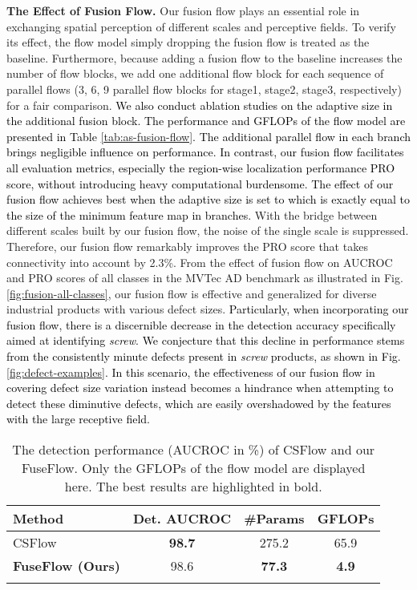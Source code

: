 \documentclass[lettersize,journal]{IEEEtran}
\newcommand{\myrule}{\specialrule{.1em}{.0ex}{.0ex}}
\newcommand{\rounda}[1]{\textcolor{black}{#1}}
\newcommand{\roundb}[1]{\textcolor{black}{#1}}
\begin{document}
\vspace{3pt}\textbf{The Effect of Fusion Flow.}
Our fusion flow plays an essential role in exchanging spatial perception of different scales and perceptive fields. To verify its effect, the flow model simply dropping the fusion flow is treated as the baseline. Furthermore, because adding a fusion flow to the baseline increases the number of flow blocks, we add one additional flow block for each sequence of parallel flows (3, 6, 9 parallel flow blocks for stage1, stage2, stage3, respectively) for a fair comparison. 
\rounda{
We also conduct ablation studies on the adaptive size in the additional fusion block. The performance and GFLOPs of the flow model are presented in Table \ref{tab:as-fusion-flow}. The additional parallel flow in each branch brings negligible influence on performance. In contrast, our fusion flow facilitates all evaluation metrics, especially the region-wise localization performance PRO score, without introducing heavy computational burdensome. The effect of our fusion flow achieves best when the adaptive size is set to  which is exactly equal to the size of the minimum feature map in  branches.}
With the bridge between different scales built by our fusion flow, the noise of the single scale is suppressed. Therefore, our fusion flow remarkably improves the PRO score that takes connectivity into account by 2.3\%. 
From the effect of fusion flow on AUCROC and PRO scores of all classes in the MVTec AD benchmark as illustrated in Fig. \ref{fig:fusion-all-classes}, our fusion flow is effective and generalized for diverse industrial products with various defect sizes.
\roundb{
  Particularly, when incorporating our fusion flow, there is a discernible decrease in the detection accuracy specifically aimed at identifying \emph{screw}. We conjecture that this decline in performance stems from the consistently minute defects present in \emph{screw} products, as shown in Fig. \ref{fig:defect-examples}. In this scenario, the effectiveness of our fusion flow in covering defect size variation instead becomes a hindrance when attempting to detect these diminutive defects, which are easily overshadowed by the features with the large receptive field.}
  \begin{table}[!htb]
    \centering
    \caption{The detection performance (AUCROC in \%) of CSFlow\cite{rudolph2022csflow} and our FuseFlow. Only the GFLOPs of the flow model are displayed here. The best results are highlighted in bold.} \label{tab:as-fuseflow}
    \rounda{
    \begin{tabular}{l|c|c|c}
    \myrule
    Method   & Det. AUCROC     & \#Params      & GFLOPs       \\ \hline
    CSFlow \cite{rudolph2022csflow}   & \textbf{98.7} & 275.2         & 65.9         \\ 
    \textbf{FuseFlow (Ours)} & 98.6          & \textbf{77.3} & \textbf{4.9} \\ \myrule
    \end{tabular}}
    \end{table}
  
\end{document}
